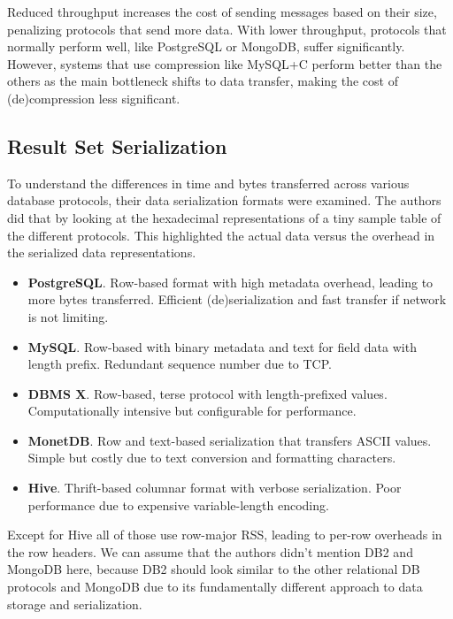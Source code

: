 \documentclass[sigconf]{acmart}
\begin{document}
Reduced throughput increases the cost of sending messages based on their size, penalizing protocols that send more data. With lower throughput, protocols that normally perform well, like PostgreSQL or MongoDB, suffer significantly. However, systems that use compression like MySQL+C perform better than the others as the main bottleneck shifts to data transfer, making the cost of (de)compression less significant.

\subsection{Result Set Serialization}
To understand the differences in time and bytes transferred across various database protocols, their data serialization formats were examined. The authors did that by looking at the hexadecimal representations of a tiny sample table of the different protocols. This highlighted the actual data versus the overhead in the serialized data representations.

\begin{itemize}
    \item \textbf{PostgreSQL}.
    Row-based format with high metadata overhead, leading to more bytes transferred. 
    Efficient (de)serialization and fast transfer if network is not limiting.
    
    \item \textbf{MySQL}.
    Row-based with binary metadata and text for field data with length prefix.
    Redundant sequence number due to TCP.
    
    \item \textbf{DBMS X}.
    Row-based, terse protocol with length-prefixed values. 
    Computationally intensive but configurable for performance.
    
    \item \textbf{MonetDB}.
    Row and text-based serialization that transfers ASCII values. 
    Simple but costly due to text conversion and formatting characters.
    
    \item \textbf{Hive}.
    Thrift-based columnar format with verbose serialization. 
    Poor performance due to expensive variable-length encoding.
\end{itemize}


Except for Hive all of those use row-major RSS, leading to per-row overheads in the row headers. We can assume that the authors didn't mention DB2 and MongoDB here, because DB2 should look similar to the other relational DB protocols and MongoDB due to its fundamentally different approach to data storage and serialization.
\end{document}
